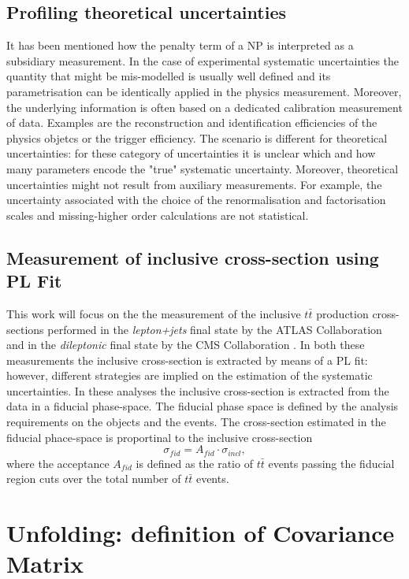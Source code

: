 \documentclass[12pt]{article}
\begin{document}
\subsection{Profiling theoretical uncertainties}
It has been mentioned how the penalty term of a NP is interpreted as a subsidiary measurement. In the case of experimental systematic uncertainties the quantity that might be mis-modelled is usually well defined and its parametrisation can be identically applied in the physics measurement. Moreover, the underlying information is often based on a dedicated calibration measurement of data. Examples are the reconstruction and identification efficiencies of the physics objetcs or the trigger efficiency.
The scenario is different for theoretical uncertainties: for these category of uncertainties it is unclear which and how many parameters encode the "true" systematic uncertainty. Moreover, theoretical uncertainties might not result from auxiliary measurements. For example, the uncertainty associated with the choice of the renormalisation and factorisation scales and missing-higher order calculations are not statistical.   

\subsection{Measurement of inclusive cross-section using PL Fit}
This work will focus on the the measurement of the inclusive $t\bar{t}$ production cross-sections performed in the \emph{lepton+jets} final state by the ATLAS Collaboration \cite{Aad_2020} and in the \emph{dileptonic} final state by the CMS Collaboration \cite{CMS_inclusive}. In both these measurements the inclusive cross-section is extracted by means of a PL fit: however, different strategies are implied on the estimation of the systematic uncertainties. 
In these analyses the inclusive cross-section is extracted from the data in a fiducial phase-space. The fiducial phase space is defined by the analysis requirements on the objects and the events. The cross-section estimated in the fiducial phace-space is proportinal to the inclusive cross-section
\begin{equation}
\sigma_{fid} = A_{fid} \cdot \sigma_{incl}, 
\end{equation}
where the acceptance $A_{fid}$ is defined as the ratio of $t\bar{t}$ events passing the fiducial region cuts over the total number of $t\bar{t}$ events.


\section{Unfolding: definition of Covariance Matrix}
\end{document}
